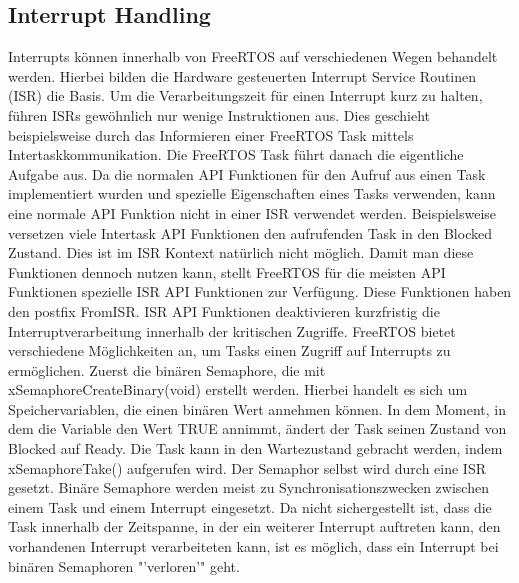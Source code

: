 \subsection{Interrupt Handling}
\label{sec:Interrupt}
Interrupts können innerhalb von FreeRTOS auf verschiedenen Wegen behandelt werden. Hierbei bilden die Hardware gesteuerten Interrupt Service Routinen (ISR) die Basis. Um die Verarbeitungszeit für einen Interrupt kurz zu halten, führen ISRs gewöhnlich nur wenige Instruktionen aus. Dies geschieht beispielsweise durch das Informieren einer FreeRTOS Task mittels Intertaskkommunikation. Die FreeRTOS Task führt danach die eigentliche Aufgabe aus. Da die normalen API Funktionen für den Aufruf aus einen Task implementiert wurden und spezielle Eigenschaften eines Tasks verwenden, kann eine normale API Funktion nicht in einer ISR verwendet werden. Beispielsweise versetzen viele Intertask API Funktionen den aufrufenden Task in den Blocked Zustand. Dies ist im ISR Kontext natürlich nicht möglich. Damit man diese Funktionen dennoch nutzen kann, stellt FreeRTOS für die meisten API Funktionen spezielle ISR API Funktionen zur Verfügung. Diese Funktionen haben den postfix FromISR. ISR API Funktionen deaktivieren kurzfristig die Interruptverarbeitung innerhalb der kritischen Zugriffe.
FreeRTOS bietet verschiedene Mög\-lich\-keit\-en an, um Tasks einen Zugriff auf Interrupts zu ermöglichen.\newline
Zuerst die binären Semaphore, die mit xSemaphoreCreateBinary(void) erstellt werden. Hierbei handelt es sich um Speichervariablen, die einen binären Wert annehmen können. In dem Moment, in dem die Variable den Wert TRUE annimmt, ändert der Task seinen Zustand von Blocked auf Ready. Die Task kann in den Wartezustand gebracht werden, indem xSemaphoreTake() aufgerufen wird. Der Semaphor selbst wird durch eine ISR gesetzt. 
Binäre Semaphore werden meist zu Synchronisationszwecken zwischen einem Task und einem Interrupt eingesetzt.
Da nicht sichergestellt ist, dass die Task innerhalb der Zeitspanne, in der ein weiterer Interrupt auftreten kann, den vorhandenen Interrupt verarbeiteten kann, ist es möglich, dass ein Interrupt bei binären Semaphoren "'verloren'" geht.
